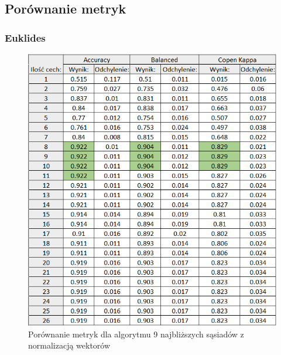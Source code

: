 \documentclass[12pt]{article}
\begin{document}

\subsection{Porównanie metryk}
\subsubsection{Euklides}
\begin{figure}[H]
	\centering
		\includegraphics[scale=0.9]{images/metrics/9nn_euklides_norm_tab.png}
	\caption{Porównanie metryk dla algorytmu 9 najbliższych sąsiadów z normalizacją wektorów}
\end{figure}
\end{document}
